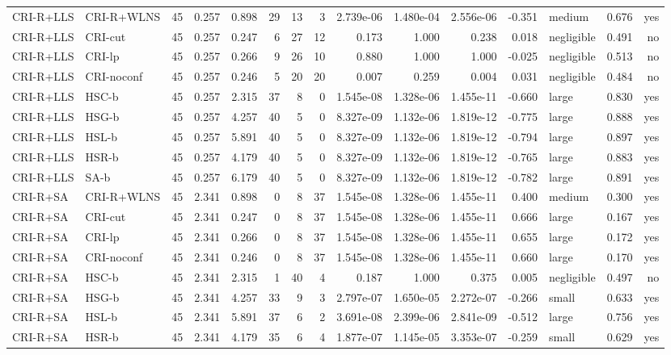 \begin{table}[htbp]
\begin{tabular}{llrrrrrrrrrrlrr}
CRI-R+LLS & CRI-R+WLNS & 45 & 0.257 & 0.898 & 29 & 13 & 3 & 2.739e-06 & 1.480e-04 & 2.556e-06 & -0.351 & medium & 0.676 & yes \\
CRI-R+LLS & CRI-cut & 45 & 0.257 & 0.247 & 6 & 27 & 12 & 0.173 & 1.000 & 0.238 & 0.018 & negligible & 0.491 & no \\
CRI-R+LLS & CRI-lp & 45 & 0.257 & 0.266 & 9 & 26 & 10 & 0.880 & 1.000 & 1.000 & -0.025 & negligible & 0.513 & no \\
CRI-R+LLS & CRI-noconf & 45 & 0.257 & 0.246 & 5 & 20 & 20 & 0.007 & 0.259 & 0.004 & 0.031 & negligible & 0.484 & no \\
CRI-R+LLS & HSC-b & 45 & 0.257 & 2.315 & 37 & 8 & 0 & 1.545e-08 & 1.328e-06 & 1.455e-11 & -0.660 & large & 0.830 & yes \\
CRI-R+LLS & HSG-b & 45 & 0.257 & 4.257 & 40 & 5 & 0 & 8.327e-09 & 1.132e-06 & 1.819e-12 & -0.775 & large & 0.888 & yes \\
CRI-R+LLS & HSL-b & 45 & 0.257 & 5.891 & 40 & 5 & 0 & 8.327e-09 & 1.132e-06 & 1.819e-12 & -0.794 & large & 0.897 & yes \\
CRI-R+LLS & HSR-b & 45 & 0.257 & 4.179 & 40 & 5 & 0 & 8.327e-09 & 1.132e-06 & 1.819e-12 & -0.765 & large & 0.883 & yes \\
CRI-R+LLS & SA-b & 45 & 0.257 & 6.179 & 40 & 5 & 0 & 8.327e-09 & 1.132e-06 & 1.819e-12 & -0.782 & large & 0.891 & yes \\
CRI-R+SA & CRI-R+WLNS & 45 & 2.341 & 0.898 & 0 & 8 & 37 & 1.545e-08 & 1.328e-06 & 1.455e-11 & 0.400 & medium & 0.300 & yes \\
CRI-R+SA & CRI-cut & 45 & 2.341 & 0.247 & 0 & 8 & 37 & 1.545e-08 & 1.328e-06 & 1.455e-11 & 0.666 & large & 0.167 & yes \\
CRI-R+SA & CRI-lp & 45 & 2.341 & 0.266 & 0 & 8 & 37 & 1.545e-08 & 1.328e-06 & 1.455e-11 & 0.655 & large & 0.172 & yes \\
CRI-R+SA & CRI-noconf & 45 & 2.341 & 0.246 & 0 & 8 & 37 & 1.545e-08 & 1.328e-06 & 1.455e-11 & 0.660 & large & 0.170 & yes \\
CRI-R+SA & HSC-b & 45 & 2.341 & 2.315 & 1 & 40 & 4 & 0.187 & 1.000 & 0.375 & 0.005 & negligible & 0.497 & no \\
CRI-R+SA & HSG-b & 45 & 2.341 & 4.257 & 33 & 9 & 3 & 2.797e-07 & 1.650e-05 & 2.272e-07 & -0.266 & small & 0.633 & yes \\
CRI-R+SA & HSL-b & 45 & 2.341 & 5.891 & 37 & 6 & 2 & 3.691e-08 & 2.399e-06 & 2.841e-09 & -0.512 & large & 0.756 & yes \\
CRI-R+SA & HSR-b & 45 & 2.341 & 4.179 & 35 & 6 & 4 & 1.877e-07 & 1.145e-05 & 3.353e-07 & -0.259 & small & 0.629 & yes \\

\end{tabular}
\end{table}
